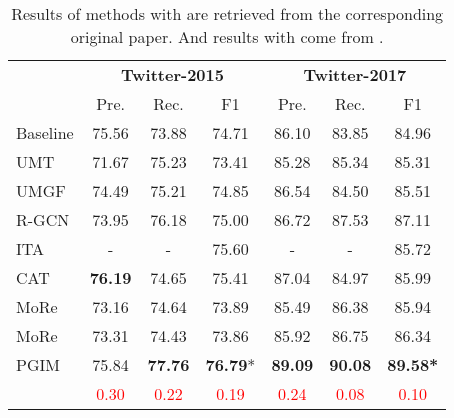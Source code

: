\documentclass[11pt]{article}
\begin{document}
\begin{table}[t!]
\small
\setlength\tabcolsep{1.6pt}
\renewcommand{\arraystretch}{1.2}
\centering
\begin{tabular}{l|cccccc}
\toprule
& \multicolumn{3}{c|}{\textbf{Twitter-2015}} & \multicolumn{3}{c}{\textbf{Twitter-2017}}\\
& Pre. & Rec. & \multicolumn{1}{c|}{F1}  & Pre. & Rec. & \multicolumn{1}{c}{F1}    \\
\midrule
Baseline   & 75.56 &  73.88 & \multicolumn{1}{c|}{74.71}  & 86.10 & 83.85 & 84.96  \\
UMT    & 71.67 & 75.23 & \multicolumn{1}{c|}{73.41}  & 85.28 & 85.34 & 85.31  \\
UMGF    & 74.49  & 75.21 & \multicolumn{1}{c|}{74.85}  & 86.54  & 84.50 & 85.51  \\
R-GCN    & 73.95  & 76.18 & \multicolumn{1}{c|}{75.00}  & 86.72  & 87.53 & 87.11  \\
ITA & -  & - & \multicolumn{1}{c|}{75.60}  & -  & - & 85.72  \\
CAT  & \textbf{76.19} & 74.65 & \multicolumn{1}{c|}{75.41} & 87.04 & 84.97 & 85.99 \\
MoRe & 73.16 & 74.64 & \multicolumn{1}{c|}{73.89} & 85.49 & 86.38 & 85.94 \\
MoRe & 73.31 & 74.43 & \multicolumn{1}{c|}{73.86} & 85.92 & 86.75 & 86.34 \\
PGIM & 75.84 & \textbf{77.76} & \multicolumn{1}{c|}{\textbf{76.79}*} & \textbf{89.09} & \textbf{90.08} & \textbf{89.58*} \\
     & \textcolor{red}{0.30} & \textcolor{red}{0.22} & \multicolumn{1}{c|}{\textcolor{red}{0.19}} & \textcolor{red}{0.24} & \textcolor{red}{0.08} & \textcolor{red}{0.10}\\ 
\bottomrule
\end{tabular}
\caption{Results of methods with  are retrieved from the corresponding original paper. And results with  come from  \citet{wang2022cat}.}
\label{tab:PGIM BERT}
\end{table}
\end{document}
